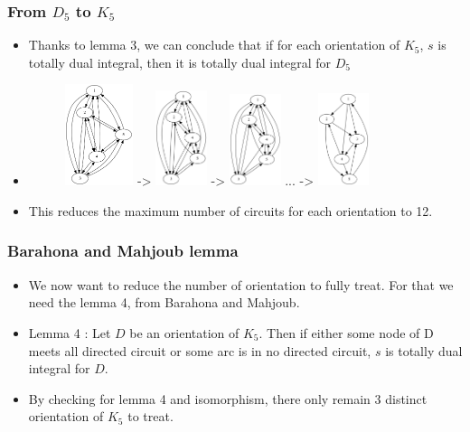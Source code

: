 \documentclass{beamer}
\begin{document}
\begin{frame}
	\frametitle{From $D_5$ to $K_5$}
	\begin{itemize}
		\item Thanks to lemma 3, we can conclude that if for each orientation of $K_5$, $s$ is totally dual integral, then it is totally dual integral for $D_5$
		\item 
		\begin{figure}
			\centering
			\includegraphics[width=2cm]{images/D5.png}
			->
			\includegraphics[width=1.5cm]{images/d5-1.png}
			->
			\includegraphics[width=1.5cm]{images/d5-2.png}
			...
			->
			\includegraphics[width=1.5cm]{images/d9.png}
		\end{figure}
		\item This reduces the maximum number of circuits for each orientation to 12.
	\end{itemize}
\end{frame}

\begin{frame}
	\frametitle{Barahona and Mahjoub lemma}
	\begin{itemize}
		\item We now want to reduce the number of orientation to fully treat. For that we need the lemma 4, from Barahona and Mahjoub.
		\item Lemma 4 : Let $D$ be an orientation of $K_5$. Then if either some node of D meets all directed circuit or some arc is in no directed circuit, $s$ is totally dual integral for $D$.
		\item By checking for lemma 4 and isomorphism, there only remain 3 distinct orientation of $K_5$ to treat.
	\end{itemize}
\end{frame}
\end{document}
